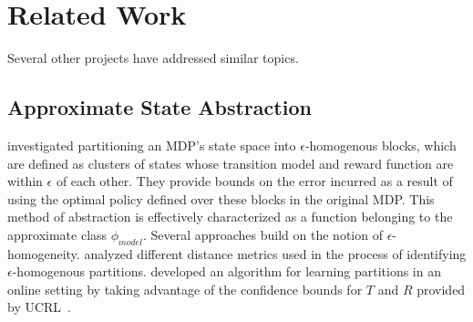 \section{Related Work}

Several other projects have addressed similar topics.

%
%
%


\subsection{Approximate State Abstraction}
\citeauthor*{dean1997model} investigated partitioning an MDP's state space into $\epsilon$-homogenous blocks, which are defined as clusters of states whose transition model and reward function are within $\epsilon$ of each other. They provide bounds on the error incurred as a result of using the optimal policy defined over these blocks in the original MDP. This method of abstraction is effectively characterized as a function belonging to the approximate class $\phi_{model}$.
Several approaches build on the notion of $\epsilon$-homogeneity. \citeauthor*{even2003approximate} analyzed different distance metrics used in the process of identifying $\epsilon$-homogenous partitions. \citeauthor*{ortner2013adaptive} developed an algorithm for learning partitions in an online setting by taking advantage of the confidence bounds for $T$ and $R$ provided by UCRL~\cite{auer2009near}.

